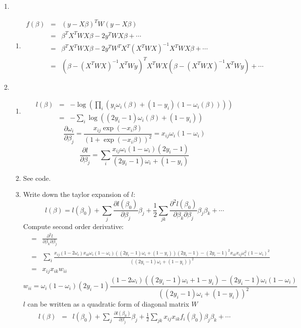 \documentclass{article}
\begin{document}
\begin{enumerate}
\item
\begin{enumerate}[A]
\item
\begin{eqnarray}
f(\beta)&=&(y-X\beta)^TW(y-X\beta)\nonumber\\
&=&\beta^TX^TWX\beta-2y^TWX\beta+\cdots\nonumber\\
&=&\beta^T X^TWX\beta-2y^TW^TX^T(X^TWX)^{-1}X^TWX\beta+\cdots\nonumber\\
&=&(\beta-(X^TWX)^{-1}X^TWy)^TX^TWX(\beta-(X^TWX)^{-1}X^TWy)+\cdots
\end{eqnarray}
\end{enumerate}
\item
\begin{enumerate}[A]
\item
\begin{eqnarray}
l(\beta)&=&-\log(\prod_i(y_i\omega_i(\beta)+(1-y_i)(1-\omega_i(\beta))))\nonumber\\
&=&-\sum_i\log((2y_i-1)\omega_i(\beta)+(1-y_i))
\end{eqnarray}
\[
\frac{\partial\omega_i}{\partial\beta_j}=\frac{x_{ij}\exp(-x_i\beta)}{(1+\exp(-x_i\beta))^2}=x_{ij}\omega_i(1-\omega_i)
\]
\[
\frac{\partial l}{\partial\beta_j}=\sum_i\frac{x_{ij}\omega_i(1-\omega_i)(2y_i-1)}{(2y_i-1)\omega_i+(1-y_i)}
\]
\item
See code.
\item
Write down the taylor expansion of $l$:
\[
l(\beta)=l(\beta_0)+\sum_j\frac{\partial l(\beta_0)}{\partial\beta_j}\beta_j+\frac{1}{2}\sum_{jk}\frac{\partial^2l(\beta_0)}{\partial\beta_k\partial\beta_j}\beta_j\beta_k+\cdots
\]
Compute second order derivative:
\begin{eqnarray}
&=&\frac{\partial^2 l}{\partial\beta_k\partial\beta_j}\nonumber\\
&=&\sum_i\frac{x_{ij}(1-2\omega_i)x_{ik}\omega_i(1-\omega_i)((2y_i-1)\omega_i+(1-y_i))(2y_i-1)-(2y_i-1)^2x_{ik}x_{ij}\omega_i^2(1-\omega_i)^2}{((2y_i-1)\omega_i+(1-y_i))^2}\nonumber\\
&=&x_{ij}x_{ik}w_{ii}
\end{eqnarray}
\[
w_{ii}=\omega_i(1-\omega_i)(2y_i-1)\frac{(1-2\omega_i)((2y_i-1)\omega_i+1-y_i)-(2y_i-1)\omega_i(1-\omega_i)}{((2y_i-1)\omega_i+(1-y_i))^2}
\]
$l$ can be written as a quadratic form of diagonal matrix $W$
\begin{eqnarray}
l(\beta)&=&l(\beta_0)+\sum_j\frac{\partial l(\beta_0)}{\partial\beta_j}\beta_j+\frac{1}{2}\sum_{jk}x_{ij}x_{ik}f_i(\beta_0)\beta_j\beta_k+\cdots\nonumber\\

\end{eqnarray}
\end{enumerate}
\end{enumerate}
\end{document}
